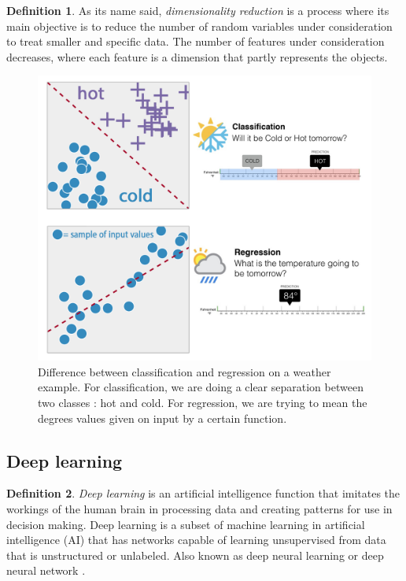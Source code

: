 \documentclass[11pt, openany]{report}
\theoremstyle{plain}
\theoremstyle{definition}
\newtheorem{defn}{Definition}[section]
\theoremstyle{remark}
\begin{document}
\begin{defn}
As its name said, \textit{dimensionality reduction} is a process where its main objective is to reduce the number of random variables under consideration to treat smaller and specific data. The number of features under consideration decreases, where each feature is a dimension that partly represents the objects.
\end{defn}



\begin{figure}[h]
  \centering
  \includegraphics[scale=0.8]{figures/classification-regression.png}
  \caption{Difference between classification and regression on a weather example. For classification, we are doing a clear separation between two classes : hot and cold. For regression, we are trying to mean the degrees values given on input by a certain function.}
  \label{fig:classification-regression}
\end{figure}

\newpage
\subsection{Deep learning}

\begin{defn}
\textit{Deep learning} is an artificial intelligence function that imitates the workings of the human brain in processing data and creating patterns for use in decision making. Deep learning is a subset of machine learning in artificial intelligence (AI) that has networks capable of learning unsupervised from data that is unstructured or unlabeled. Also known as deep neural learning or deep neural network \cite{DL-1}. 
\end{defn}
\end{document}
